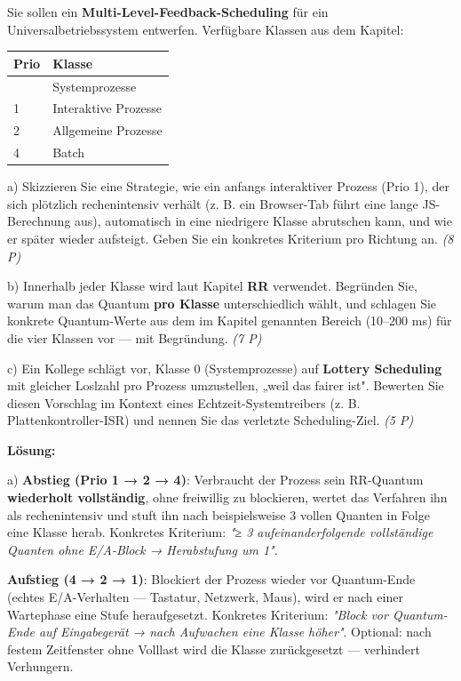 \documentclass[11pt, a4paper]{article}
\begin{document}
Sie sollen ein \textbf{Multi-Level-Feedback-Scheduling} für ein Universalbetriebssystem entwerfen. Verfügbare Klassen aus dem Kapitel:



{\small
\begin{tabularx}{\linewidth}{XX}
\hline
\rowcolor{tableheadbg}
{\color{white}\textbf{Prio}} & {\color{white}\textbf{Klasse}} \\[2pt]
\hline
\endhead
\hline
\endfoot
0 & Systemprozesse \\
1 & Interaktive Prozesse \\
2 & Allgemeine Prozesse \\
4 & Batch \\
\end{tabularx}
}


a) Skizzieren Sie eine Strategie, wie ein anfangs interaktiver Prozess (Prio 1), der sich plötzlich rechenintensiv verhält (z. B. ein Browser-Tab führt eine lange JS-Berechnung aus), automatisch in eine niedrigere Klasse abrutschen kann, und wie er später wieder aufsteigt. Geben Sie ein konkretes Kriterium pro Richtung an. \textit{(8 P)}


b) Innerhalb jeder Klasse wird laut Kapitel \textbf{RR} verwendet. Begründen Sie, warum man das Quantum \textbf{pro Klasse} unterschiedlich wählt, und schlagen Sie konkrete Quantum-Werte aus dem im Kapitel genannten Bereich (10–200 ms) für die vier Klassen vor — mit Begründung. \textit{(7 P)}


c) Ein Kollege schlägt vor, Klasse 0 (Systemprozesse) auf \textbf{Lottery Scheduling} mit gleicher Loslzahl pro Prozess umzustellen, „weil das fairer ist". Bewerten Sie diesen Vorschlag im Kontext eines Echtzeit-Systemtreibers (z. B. Plattenkontroller-ISR) und nennen Sie das verletzte Scheduling-Ziel. \textit{(5 P)}


\textbf{Lösung:}


a) \textbf{Abstieg (Prio 1 → 2 → 4)}: Verbraucht der Prozess sein RR-Quantum \textbf{wiederholt vollständig}, ohne freiwillig zu blockieren, wertet das Verfahren ihn als rechenintensiv und stuft ihn nach beispielsweise 3 vollen Quanten in Folge eine Klasse herab. Konkretes Kriterium: \textit{"≥ 3 aufeinanderfolgende vollständige Quanten ohne E/A-Block → Herabstufung um 1"}.


\textbf{Aufstieg (4 → 2 → 1)}: Blockiert der Prozess wieder vor Quantum-Ende (echtes E/A-Verhalten — Tastatur, Netzwerk, Maus), wird er nach einer Wartephase eine Stufe heraufgesetzt. Konkretes Kriterium: \textit{"Block vor Quantum-Ende auf Eingabegerät → nach Aufwachen eine Klasse höher"}. Optional: nach festem Zeitfenster ohne Volllast wird die Klasse zurückgesetzt — verhindert Verhungern.
\end{document}
